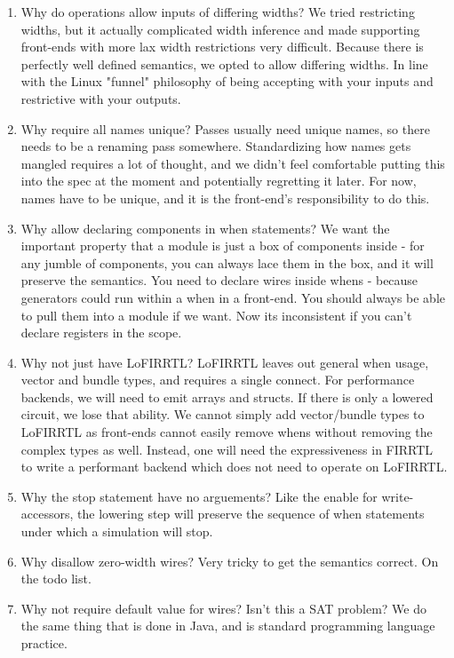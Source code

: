 \documentclass[12pt]{article}
\begin{document}
\begin{enumerate}[topsep=3pt,itemsep=-0.5ex,partopsep=1ex,parsep=1ex]
\item Why do operations allow inputs of differing widths? 
We tried restricting widths, but it actually complicated width inference and made supporting front-ends with more lax width restrictions very difficult.
Because there is perfectly well defined semantics, we opted to allow differing widths.
In line with the Linux "funnel" philosophy of being accepting with your inputs and restrictive with your outputs.

\item Why require all names unique?
Passes usually need unique names, so there needs to be a renaming pass somewhere.
Standardizing how names gets mangled requires a lot of thought, and we didn't feel comfortable putting this into the spec at the moment and potentially regretting it later.
For now, names have to be unique, and it is the front-end's responsibility to do this.

\item Why allow declaring components in when statements? 
We want the important property that a module is just a box of components inside - for any jumble of components, you can always lace them in the box, and it will preserve the semantics.
You need to declare wires inside whens - because generators could run within a when in a front-end.
You should always be able to pull them into a module if we want.
Now its inconsistent if you can't declare registers in the scope.

\item Why not just have LoFIRRTL?
LoFIRRTL leaves out general when usage, vector and bundle types, and requires a single connect.
For performance backends, we will need to emit arrays and structs.
If there is only a lowered circuit, we lose that ability.
We cannot simply add vector/bundle types to LoFIRRTL as front-ends cannot easily remove whens without removing the complex types as well.
Instead, one will need the expressiveness in FIRRTL to write a performant backend which does not need to operate on LoFIRRTL.

\item Why the stop statement have no arguements?
Like the enable for write-accessors, the lowering step will preserve the sequence of when statements under which a simulation will stop.

\item Why disallow zero-width wires? 
Very tricky to get the semantics correct.
On the todo list.

\item Why not require default value for wires? Isn't this a SAT problem?
We do the same thing that is done in Java, and is standard programming language practice.


\end{enumerate}
\end{document}
